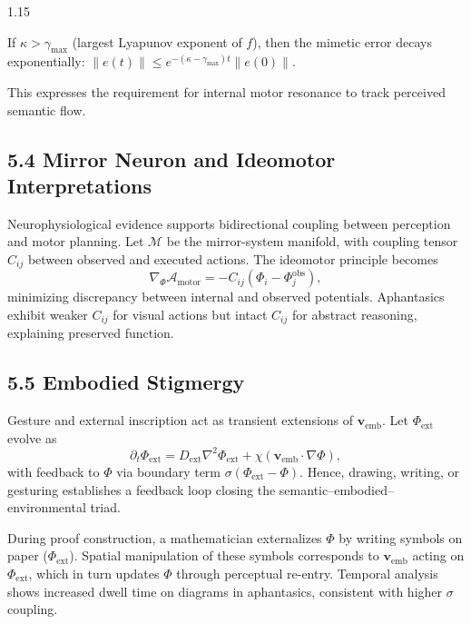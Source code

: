 \documentclass[12pt,a4paper]{article}
\begin{document}
\begin{spacing}{1.15}
\begin{theorem}
If $\kappa>\gamma_{\max}$ (largest Lyapunov exponent of $f$), then the mimetic error decays exponentially:
$\|e(t)\|\le e^{-(\kappa-\gamma_{\max})t}\|e(0)\|$.
\end{theorem}

This expresses the requirement for internal motor resonance to track perceived semantic flow.

\subsection{5.4 Mirror Neuron and Ideomotor Interpretations}

Neurophysiological evidence supports bidirectional coupling between perception and motor planning.  
Let $\mathcal{M}$ be the mirror-system manifold, with coupling tensor $C_{ij}$ between observed and executed actions.  
The ideomotor principle becomes
\[
\nabla_\Phi \mathcal{A}_{\mathrm{motor}}
 = -C_{ij}(\Phi_i-\Phi_j^{\mathrm{obs}}),
\]
minimizing discrepancy between internal and observed potentials.  
Aphantasics exhibit weaker $C_{ij}$ for visual actions but intact $C_{ij}$ for abstract reasoning, explaining preserved function.

\subsection{5.5 Embodied Stigmergy}

Gesture and external inscription act as transient extensions of $\boldsymbol{v}_{\mathrm{emb}}$.  
Let $\Phi_{\mathrm{ext}}$ evolve as
\[
\partial_t \Phi_{\mathrm{ext}}
 = D_{\mathrm{ext}}\nabla^2\Phi_{\mathrm{ext}}
 + \chi(\boldsymbol{v}_{\mathrm{emb}}\!\cdot\!\nabla\Phi),
\]
with feedback to $\Phi$ via boundary term $\sigma(\Phi_{\mathrm{ext}}-\Phi)$.
Hence, drawing, writing, or gesturing establishes a feedback loop closing the semantic–embodied–environmental triad.

\begin{example}
During proof construction, a mathematician externalizes $\Phi$ by writing symbols on paper ($\Phi_{\mathrm{ext}}$).  
Spatial manipulation of these symbols corresponds to $\boldsymbol{v}_{\mathrm{emb}}$ acting on $\Phi_{\mathrm{ext}}$, which in turn updates $\Phi$ through perceptual re-entry.  
Temporal analysis shows increased dwell time on diagrams in aphantasics, consistent with higher $\sigma$ coupling.
\end{example}


\end{spacing}
\end{document}
